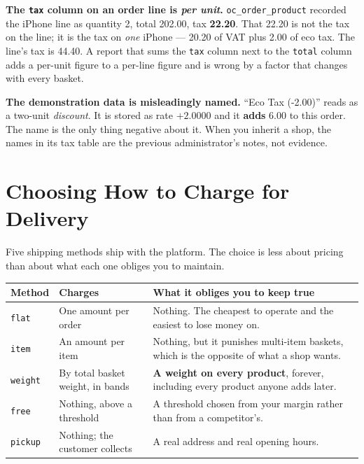 \begin{alertbox}
\textbf{The \texttt{tax} column on an order line is \emph{per unit}.}
\texttt{oc\_order\_product} recorded the iPhone line as quantity 2, total
202.00, tax \textbf{22.20}. That 22.20 is not the tax on the line; it is the
tax on \emph{one} iPhone --- 20.20 of VAT plus 2.00 of eco tax. The line's tax
is 44.40. A report that sums the \texttt{tax} column next to the
\texttt{total} column adds a per-unit figure to a per-line figure and is wrong
by a factor that changes with every basket.

\smallskip
\textbf{The demonstration data is misleadingly named.} ``Eco Tax (-2.00)''
reads as a two-unit \emph{discount}. It is stored as rate $+2.0000$ and it
\textbf{adds} 6.00 to this order. The name is the only thing negative about it.
When you inherit a shop, the names in its tax table are the previous
administrator's notes, not evidence.
\end{alertbox}

\section{Choosing How to Charge for Delivery}

Five shipping methods ship with the platform. The choice is less about pricing
than about what each one obliges you to maintain.

\begin{longtable}{@{}L{2.4cm}L{5.4cm}L{6.4cm}@{}}
\toprule
{}
\textbf{Method} & \textbf{Charges} & \textbf{What it obliges you to keep
true} \\
\midrule
\endhead
\texttt{flat} & One amount per order & Nothing. The cheapest to operate and
the easiest to lose money on. \\
\texttt{item} & An amount per item & Nothing, but it punishes multi-item
baskets, which is the opposite of what a shop wants. \\
\texttt{weight} & By total basket weight, in bands & \textbf{A weight on every
product}, forever, including every product anyone adds later. \\
\texttt{free} & Nothing, above a threshold & A threshold chosen from your
margin rather than from a competitor's. \\
\texttt{pickup} & Nothing; the customer collects & A real address and real
opening hours. \\
\bottomrule
\end{longtable}

